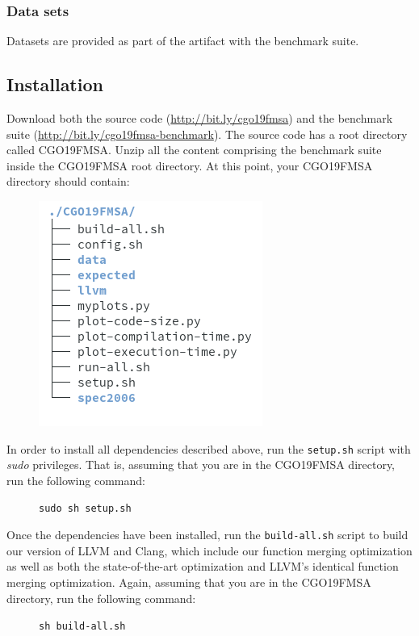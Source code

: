 \documentclass{sigplanconf}
\begin{document}
{\subsubsection{Data sets}

Datasets are provided as part of the artifact with the benchmark suite.

\subsection{Installation}

Download both the source code (\url{http://bit.ly/cgo19fmsa}) and the benchmark suite
(\url{http://bit.ly/cgo19fmsa-benchmark}).
The source code has a root directory called CGO19FMSA.
Unzip all the content comprising the benchmark suite inside the CGO19FMSA root directory.
At this point, your CGO19FMSA directory should contain:
\begin{figure}[h]
\includegraphics[scale=0.5]{figs/tree.png}
\end{figure}

In order to install all dependencies described above, run the \texttt{setup.sh}
script with \textit{sudo} privileges. That is, assuming that you are in the
CGO19FMSA directory, run the following command:
\begin{figure}[h]
\texttt{sudo sh setup.sh}
\end{figure}

Once the dependencies have been installed, run the \texttt{build-all.sh}
script to build our version of LLVM and Clang, which include our function
merging optimization as well as both the state-of-the-art optimization and LLVM's
identical function merging optimization.
Again, assuming that you are in the CGO19FMSA directory, run the following
command:
\begin{figure}[h]
\texttt{sh build-all.sh}
\end{figure}

}
\end{document}
